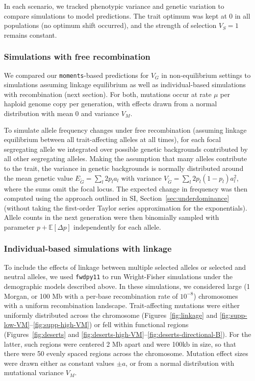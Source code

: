 \documentclass{article}
\newcommand{\E}{\mathbb{E}}
\newcommand{\moments}{\texttt{moments}\xspace}
\newcommand{\fwdpy}{\texttt{fwdpy11}\xspace}
\begin{document}
In each scenario, we tracked phenotypic variance and genetic variation to
compare simulations to model predictions. The trait optimum was kept at $0$ in
all populations (no optimum shift occurred), and the strength of selection
$V_S=1$ remains constant.


\subsubsection*{Simulations with free recombination}

We compared our \moments-based predictions for $V_G$ in non-equilibrium
settings to simulations assuming linkage equilibrium as well as
individual-based simulations with recombination (next section). For both,
mutations occur at rate $\mu$ per haploid genome copy per generation, with
effects drawn from a normal distribution with mean 0 and variance $V_M$.

To simulate allele frequency changes under free recombination (assuming linkage
equilibrium between all trait-affecting alleles at all times), for each focal
segregating allele we integrated over possible genetic backgrounds contributed
by all other segregating alleles. Making the assumption that many alleles
contribute to the trait, the variance in genetic backgrounds is normally
distributed around the mean genetic value $E_{\tilde{G}}=\sum_l 2p_l a_l$ with
variance $V_{\tilde{G}}=\sum_l 2p_l(1-p_l)a_l^2$, where the sums omit the focal
locus. The expected change in frequency was then computed using the approach
outlined in SI, Section~\ref{sec:underdominance} (without taking the
first-order Taylor series approximation for the exponentials). Allele counts in
the next generation were then binomially sampled with parameter $p+\E[\Delta
p]$ independently for each allele.

\subsubsection*{Individual-based simulations with linkage}

To include the effects of linkage between multiple selected alleles or selected
and neutral alleles, we used \fwdpy \citep{thornton2019polygenic} to run
Wright-Fisher simulations under the demographic models described above. In
these simulations, we considered large (1 Morgan, or 100 Mb with a per-base
recombination rate of $10^{-8}$) chromosomes with a uniform recombination
landscape. Trait-affecting mutations were either uniformly distributed across
the chromosome (Figures~\ref{fig:linkage} and
\ref{fig:supp-low-VM}--\ref{fig:supp-high-VM}) or fell within functional
regions (Figures~\ref{fig:deserts} and
\ref{fig:deserts-high-VM}--\ref{fig:deserts-directional-B}). For the latter,
such regions were centered 2 Mb apart and were 100kb in size, so that there
were 50 evenly spaced regions across the chromosome. Mutation effect sizes were
drawn either as constant values $\pm a$, or from a normal distribution with
mutational variance $V_M$.
\end{document}
